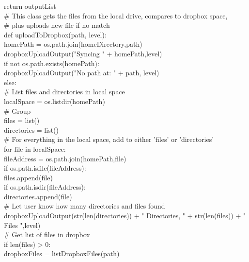 \documentclass[a4paper,11pt]{report}
\begin{document}
    return outputList\\

\# This class gets the files from the local drive, compares to dropbox space, \\
\# plus uploads new file if no match\\
def uploadToDropbox(path, level):\\
    homePath = os.path.join(homeDirectory,path)\\
    dropboxUploadOutput("Syncing " + homePath,level)\\

    if not os.path.exists(homePath):\\
        dropboxUploadOutput("No path at: " + path, level)\\
    else:\\
        \# List files and directories in local space\\
        localSpace = os.listdir(homePath)\\

        \# Group      \\
        files = list()\\
        directories = list()\\

        \# For everything in the local space, add to either 'files' or 'directories'\\
        for file in localSpace:\\
            fileAddress = os.path.join(homePath,file)\\
            if os.path.isfile(fileAddress):\\
                files.append(file)       \\
            if os.path.isdir(fileAddress):\\
                directories.append(file)\\

        \# Let user know how many directories and files found\\
        dropboxUploadOutput(str(len(directories)) + " Directories, " + str(len(files)) + " Files ",level)\\

        \# Get list of files in dropbox\\
        if len(files) > 0:\\
            dropboxFiles = listDropboxFiles(path)\\
\end{document}
